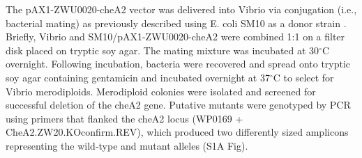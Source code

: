 The pAX1-ZWU0020-cheA2 vector was delivered into Vibrio via conjugation (i.e., bacterial mating) as previously described using E. coli SM10 as a donor strain \cite{wiles_modernized_2018}. Briefly, Vibrio and SM10/pAX1-ZWU0020-cheA2 were combined 1:1 on a filter disk placed on tryptic soy agar. The mating mixture was incubated at 30$^\circ$C overnight. Following incubation, bacteria were recovered and spread onto tryptic soy agar containing gentamicin and incubated overnight at 37$^\circ$C to select for Vibrio merodiploids. Merodiploid colonies were isolated and screened for successful deletion of the cheA2 gene. Putative mutants were genotyped by PCR using primers that flanked the cheA2 locus (WP0169 + CheA2.ZW20.KOconfirm.REV), which produced two differently sized amplicons representing the wild-type and mutant alleles (S1A Fig). 

